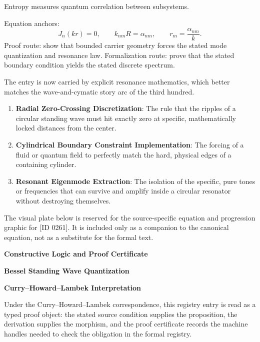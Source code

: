 Entropy measures quantum correlation between subsystems.

Equation anchors:
\[
J_n(kr)=0,
\qquad
k_{nm}R=\alpha_{nm},
\qquad
r_m=\frac{\alpha_{nm}}{k}.
\]
Proof route: show that bounded carrier geometry forces the stated mode quantization and resonance law. Formalization route: prove that the stated boundary condition yields the stated discrete spectrum.

The entry is now carried by explicit resonance mathematics, which better matches the wave-and-cymatic story arc of the third hundred.
\endgroup

\begin{enumerate}[leftmargin=1.6em,itemsep=6pt,topsep=4pt]
\item \textbf{Radial Zero-Crossing Discretization}: The rule that the ripples of a circular standing wave must hit exactly zero at specific, mathematically locked distances from the center.
\item \textbf{Cylindrical Boundary Constraint Implementation}: The forcing of a fluid or quantum field to perfectly match the hard, physical edges of a containing cylinder.
\item \textbf{Resonant Eigenmode Extraction}: The isolation of the specific, pure tones or frequencies that can survive and amplify inside a circular resonator without destroying themselves.
\end{enumerate}

\begingroup\footnotesize\sloppy
The visual plate below is reserved for the source-specific equation and progression graphic for [ID 0261]. It is included only as a companion to the canonical equation, not as a substitute for the formal text.
\par\endgroup
\ifTZPDarkEdition
{}
\fi

\clearpage
\begingroup\tzpsupportsetup
\noindent\textbf{\fontsize{10.8pt}{12.8pt}\selectfont [ID 0261] Constructive Logic and Proof Certificate}\par
\noindent\textbf{\fontsize{10pt}{12pt}\selectfont Bessel Standing Wave Quantization}\par
\vspace{0.45em}
\begingroup
\footnotesize
\setlength{\parskip}{0.22em}
\setlength{\parindent}{0pt}
\noindent\textbf{Curry--Howard--Lambek Interpretation}\par
Under the Curry--Howard--Lambek correspondence, this registry entry is read as a typed proof
object: the stated source condition supplies the proposition, the derivation supplies the
morphism, and the proof certificate records the machine handles needed to check the obligation
in the formal registry.

